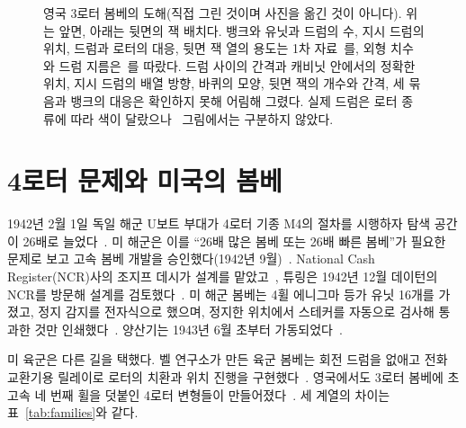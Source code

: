 \begin{figure}[p]
\centering

\caption{영국 3로터 봄베의 도해(직접 그린 것이며 사진을 옮긴 것이 아니다). 위는 앞면, 아래는 뒷면의 잭 배치다.
뱅크와 유닛과 드럼의 수, 지시 드럼의 위치, 드럼과 로터의 대응, 뒷면 잭 열의 용도는
1차 자료~\cite[5, 59, 68, 73]{us6812report1944}를, 외형 치수와 드럼 지름은~\cite{ellsbury1998bombe,us6812report1944}를
따랐다. 드럼 사이의 간격과 캐비닛 안에서의 정확한 위치, 지시 드럼의 배열 방향, 바퀴의 모양, 뒷면 잭의 개수와
간격, 세 묶음과 뱅크의 대응은 확인하지 못해 어림해 그렸다. 실제 드럼은 로터 종류에 따라 색이
달랐으나~\cite[9]{us6812report1944} 그림에서는 구분하지 않았다.}
\label{fig:bombe-front}
\end{figure}

\section{4로터 문제와 미국의 봄베}\label{sec:us-bombes}

1942년 2월 1일 독일 해군 U보트 부대가 4로터 기종 M4의 절차를 시행하자 탐색 공간이 26배로
늘었다~\cite{cryptomuseum-m4,hodges-biography}. 미 해군은 이를 ``26배 많은 봄베
또는 26배 빠른 봄베''가 필요한 문제로 보고 고속 봄베 개발을 승인했다(1942년 9월)~\cite{wenger1944history}.
National Cash Register(NCR)사의 조지프 데시가 설계를 맡았고~\cite{desch1942memo}, 튜링은 1942년 12월
데이턴의 NCR를 방문해 설계를 검토했다~\cite{turing1942ncr}. 미 해군 봄베는 4휠 에니그마 등가 유닛 16개를
가졌고, 정지 감지를 전자식으로 했으며, 정지한 위치에서 스테커를 자동으로 검사해 통과한 것만
인쇄했다~\cite{ekhall-hallenberg2018}. 양산기는 1943년 6월 초부터 가동되었다~\cite{wenger1944history}.

미 육군은 다른 길을 택했다. 벨 연구소가 만든 육군 봄베는 회전 드럼을 없애고 전화 교환기용 릴레이로
로터의 치환과 위치 진행을 구현했다~\cite{dturing2021army}. 영국에서도 3로터 봄베에 초고속 네 번째 휠을
덧붙인 4로터 변형들이 만들어졌다~\cite{jackson-bh12}. 세 계열의 차이는 표~\ref{tab:families}와 같다.

